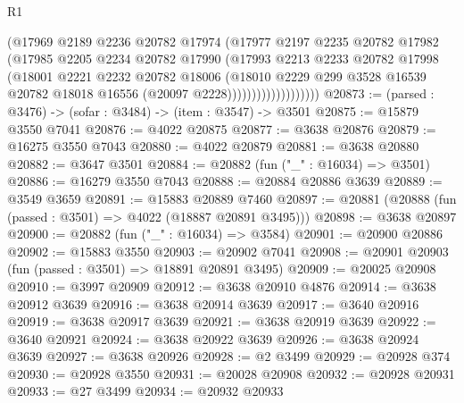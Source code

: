 \begin{lexlean}{R1}
\begin{coremodule}
                            (@17969
                              @2189
                              @2236
                              @20782
                              @17974
                              (@17977
                                @2197
                                @2235
                                @20782
                                @17982
                                (@17985
                                  @2205
                                  @2234
                                  @20782
                                  @17990
                                  (@17993
                                    @2213
                                    @2233
                                    @20782
                                    @17998
                                    (@18001
                                      @2221
                                      @2232
                                      @20782
                                      @18006
                                      (@18010
                                        @2229
                                        @299
                                        @3528
                                        @16539
                                        @20782
                                        @18018
                                        @16556
                                        (@20097 @2228)))))))))))))))))))
@20873 := (parsed : @3476) -> (sofar : @3484) -> (item : @3547) -> @3501
@20875 := @15879 @3550 @7041
@20876 := @4022 @20875
@20877 := @3638 @20876
@20879 := @16275 @3550 @7043
@20880 := @4022 @20879
@20881 := @3638 @20880
@20882 := @3647 @3501
@20884 := @20882 (fun ("_" : @16034) => @3501)
@20886 := @16279 @3550 @7043
@20888 := @20884 @20886 @3639
@20889 := @3549 @3659
@20891 := @15883 @20889 @7460
@20897 := @20881 (@20888 (fun (passed : @3501) => @4022 (@18887 @20891 @3495)))
@20898 := @3638 @20897
@20900 := @20882 (fun ("_" : @16034) => @3584)
@20901 := @20900 @20886
@20902 := @15883 @3550
@20903 := @20902 @7041
@20908 := @20901 @20903 (fun (passed : @3501) => @18891 @20891 @3495)
@20909 := @20025 @20908
@20910 := @3997 @20909
@20912 := @3638 @20910 @4876
@20914 := @3638 @20912 @3639
@20916 := @3638 @20914 @3639
@20917 := @3640 @20916
@20919 := @3638 @20917 @3639
@20921 := @3638 @20919 @3639
@20922 := @3640 @20921
@20924 := @3638 @20922 @3639
@20926 := @3638 @20924 @3639
@20927 := @3638 @20926
@20928 := @2 @3499
@20929 := @20928 @374
@20930 := @20928 @3550
@20931 := @20028 @20908
@20932 := @20928 @20931
@20933 := @27 @3499
@20934 := @20932 @20933

\end{coremodule}
\end{lexlean}
